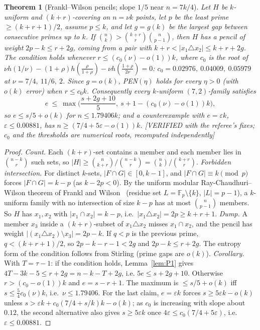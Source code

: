 \documentclass[11pt]{article}
\newtheorem{theorem}{Theorem}[section]
\theoremstyle{definition}
\newcommand{\st}[1]{\textsf{\small[#1]}}
\begin{document}
\begin{theorem}[Frankl--Wilson pencils; slope $1/5$ near $n=7k/4$]\label{thm:FW}
Let $H$ be $k$-uniform and $(k+r)$-covering on $n=\nu k$ points, let $p$ be the least prime $\ge(k+r+1)/2$, assume
$p\le k$, and let $g=g(k)$ be the largest gap between consecutive primes up to $k$. If
$\binom nk>\binom{k+r}r\binom n{p-1}$, then $H$ has a pencil of weight $2p-k\le r+2g$, coming from a pair with
$k+r<|x_1\triangle x_2|\le k+r+2g$. The condition holds whenever $r\le(c_0(\nu)-o(1))k$, where $c_0$ is the root of
$\nu h(1/\nu)-(1+\rho)h(\frac\rho{1+\rho})-\nu h(\frac{1+\rho}{2\nu})=0$: $c_0=0.02976,\ 0.04009,\ 0.05979$ at
$\nu=7/4,\ 11/6,\ 2$. Since $g=o(k)$, PEN$(\eta)$ holds for every $\eta>0$ (with $o(k)$ error) when $r\le c_0k$.
Consequently every $k$-uniform $(7,2)$-family satisfies
\[
e\ \le\ \max\Big(\frac{s+2g+10}5,\ s+1-(c_0(\nu)-o(1))k\Big),
\]
so $e\le s/5+o(k)$ for $n\le1.79406k$; and a counterexample with $e=\varepsilon k$, $\varepsilon\le0.00881$, has
$n\ge(7/4+5\varepsilon-o(1))k$. \st{VERIFIED with the referee's fixes; $c_0$ and the thresholds are numerical roots,
recomputed independently}
\end{theorem}
\begin{proof}
\emph{Count.} Each $(k+r)$-set contains a member and each member lies in $\binom{n-k}r$ such sets, so
$|H|\ge\binom n{k+r}/\binom{n-k}r=\binom nk/\binom{k+r}r$.
\emph{Forbidden intersection.} For distinct $k$-sets, $|F\cap G|\in[0,k-1]$, and $|F\cap G|\equiv k\pmod p$ forces
$|F\cap G|=k-p$ (as $k-2p<0$). By the uniform modular Ray-Chaudhuri--Wilson theorem of Frankl and Wilson~\cite{FW}
(residue set $L=\mathbb F_p\setminus\{k\}$, $|L|=p-1$), a $k$-uniform family with no intersection of size $k-p$ has at
most $\binom n{p-1}$ members. So $H$ has $x_1,x_2$ with $|x_1\cap x_2|=k-p$, i.e.\ $|x_1\triangle x_2|=2p\ge k+r+1$.
\emph{Dump.} A member $x_3$ inside a $(k+r)$-subset of $x_1\triangle x_2$ misses $x_1\cap x_2$, and the pencil has weight
$|(x_1\triangle x_2)\setminus x_3|=2p-k$. If $q<p$ is the previous prime, $q<(k+r+1)/2$, so $2p-k-r-1<2g$ and
$2p-k\le r+2g$. The entropy form of the condition follows from Stirling (prime gaps are $o(k)$).
\emph{Corollary.} With $T=\tau-1$: if the condition holds, Lemma~\ref{lem:P1} gives $4T-3k-5\le r+2g=n-k-T+2g$, i.e.
$5e\le s+2g+10$. Otherwise $r>(c_0-o(1))k$ and $e=s-r+1$. The maximum is $\le s/5+o(k)$ iff $s\le\tfrac54c_0(\nu)k$,
i.e.\ $\nu\le1.79406$. For the last claim, $e=\varepsilon k$ forces $s\ge5\varepsilon k-o(k)$ unless
$s>\varepsilon k+c_0(7/4+s/k)k-o(k)$; as $c_0$ is increasing with slope about $0.12$, the second alternative also gives
$s\ge5\varepsilon k$ once $4\varepsilon\le c_0(7/4+5\varepsilon)$, i.e.\ $\varepsilon\le0.00881$.
\end{proof}
\end{document}
